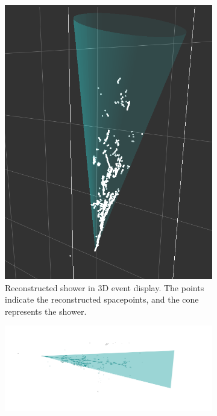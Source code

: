 \begin{figure}[htbp]
\begin{center}
\begin{subfigure}{0.45\textwidth}
\includegraphics[angle=270,width=\linewidth]{figs/reco/single_e_Evt1.png}
\caption{Reconstructed shower in 3D event display.
The points indicate the reconstructed spacepoints, and the cone
represents the shower.}
\label{fig:shr_reco_example_3d}
\end{subfigure}
\begin{subfigure}{0.45\textwidth}
\includegraphics[width=0.85\linewidth]{figs/reco/single_e_Evt1U.png}\\

\end{subfigure}
\end{center}
\end{figure}
